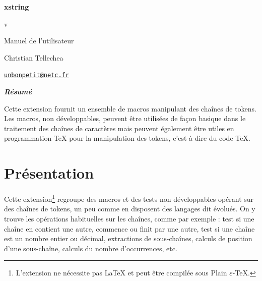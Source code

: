 \documentclass[a4paper,10pt,french]{article}
\newcommand\guill[1]{\og{}#1\fg{}}
\newcommand\Xstring{\textsf{xstring}\xspace}
\def\xstringfrenchdateaux#1/#2/#3\nil{\number#3\relax\ifnum#3=1 \noexpand\ier\fi\space \ifcase #2 \or janvier\or f\'evrier\or mars\or avril\or mai\or juin\or juillet\or aout\or septembre\or octobre\or novembre\or d\'ecembre\fi\space#1}
\edef\xstringfrenchdate{\expandafter\xstringfrenchdateaux\xstringdate\nil}
\begin{document}
\setlength{\parindent}{0pt}
\begin{titlepage}
	\null\par\vfill
	\begin{center}
		\begin{minipage}{0.75\linewidth}
			\begin{center}
				\Huge\bfseries \Xstring\par\vspace{5pt}
				\small v\xstringversion\par\vspace{25pt}
				\normalsize Manuel de l'utilisateur
			\end{center}
		\end{minipage}
	\end{center}
	\vspace{1cm}
	\begin{center}
		Christian {\sc Tellechea}\par\small
		\href{mailto:unbonpetit@netc.fr}{\nolinkurl{unbonpetit@netc.fr}}\par\vspace{5pt}
		\xstringfrenchdate
	\end{center}
	\vfill\hrulefill
	\begin{center}
		\begin{minipage}{0.85\linewidth}
			\noindent
			\hfill\textbf{\textit{Résumé}}\hfill{}\medskip\par
			Cette extension fournit un ensemble de macros manipulant des chaînes de tokens. Les macros, non développables, peuvent être utilisées de façon basique dans le traitement des chaînes de caractères mais peuvent également être utiles en programmation \TeX{} pour la manipulation des tokens, c'est-à-dire du code \TeX{}.
		\end{minipage}
	\end{center}
	\hrulefill\vfill{}
\end{titlepage}

\tableofcontents

%
\section{Présentation}
Cette extension\footnote{L'extension ne nécessite pas \LaTeX{} et peut être compilée sous Plain $\varepsilon$-\TeX{}.} regroupe des macros et des tests non développables opérant sur des chaînes de tokens, un peu comme en disposent des langages dit \guill{évolués}. On y trouve les opérations habituelles sur les chaînes, comme par exemple : test si une chaîne en contient une autre, commence ou finit par une autre, test si une chaîne est un nombre entier ou décimal, extractions de sous-chaînes, calculs de position d'une sous-chaîne, calculs du nombre d'occurrences, etc.\medskip
\end{document}

